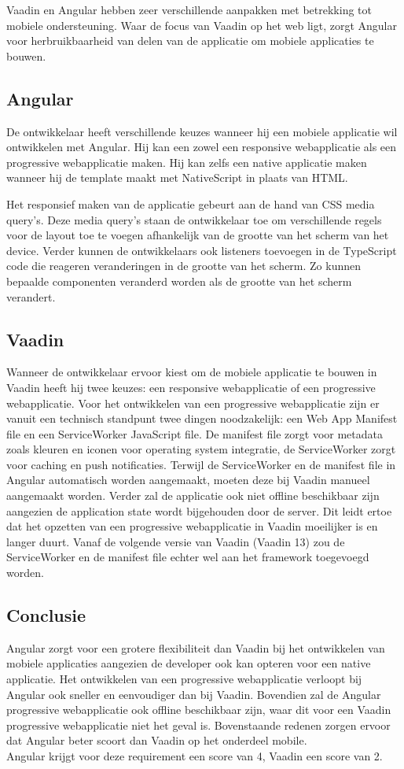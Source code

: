 Vaadin en Angular hebben zeer verschillende aanpakken met betrekking tot mobiele ondersteuning. Waar de focus van Vaadin op het web ligt, zorgt Angular voor herbruikbaarheid van delen van de applicatie om mobiele applicaties te bouwen.
\subsection{Angular}
De ontwikkelaar heeft verschillende keuzes wanneer hij een mobiele applicatie wil ontwikkelen met Angular. Hij kan een zowel een responsive webapplicatie als een progressive webapplicatie maken. Hij kan zelfs een native applicatie maken wanneer hij de template maakt met NativeScript in plaats van HTML. 

Het responsief maken van de applicatie gebeurt aan de hand van CSS media query's. Deze media query's staan de ontwikkelaar toe om verschillende regels voor de layout toe te voegen afhankelijk van de grootte van het scherm van het device. Verder kunnen de ontwikkelaars ook listeners toevoegen in de TypeScript code die reageren veranderingen in de grootte van het scherm. Zo kunnen bepaalde componenten veranderd worden als de grootte van het scherm verandert. 

\subsection{Vaadin}
Wanneer de ontwikkelaar ervoor kiest om de mobiele applicatie te bouwen in Vaadin heeft hij twee keuzes: een responsive webapplicatie of een progressive webapplicatie. 
Voor het ontwikkelen van een progressive webapplicatie zijn er vanuit een technisch standpunt twee dingen noodzakelijk: een  Web App Manifest file en een ServiceWorker JavaScript file. De manifest file zorgt voor metadata zoals kleuren en iconen voor operating system integratie, de ServiceWorker zorgt voor caching en push notificaties.
Terwijl de ServiceWorker en de manifest file in Angular automatisch worden aangemaakt, moeten deze bij Vaadin manueel aangemaakt worden. Verder zal de applicatie ook niet offline beschikbaar zijn aangezien de application state wordt bijgehouden door de server.
Dit leidt ertoe dat het opzetten van een progressive webapplicatie in Vaadin moeilijker is en langer duurt.  
Vanaf de volgende versie van Vaadin (Vaadin 13) zou de ServiceWorker en de manifest file echter wel aan het framework toegevoegd worden. 
\subsection{Conclusie}
Angular zorgt voor een grotere flexibiliteit dan Vaadin bij het ontwikkelen van mobiele applicaties aangezien de developer ook kan opteren voor een native applicatie. Het ontwikkelen van een progressive webapplicatie verloopt bij Angular ook sneller en eenvoudiger dan bij Vaadin. Bovendien zal de Angular progressive webapplicatie ook offline beschikbaar zijn, waar dit voor een Vaadin progressive webapplicatie niet het geval is. Bovenstaande redenen zorgen ervoor dat Angular beter scoort dan Vaadin op het onderdeel mobile. \\
Angular krijgt voor deze requirement een score van 4, Vaadin een score van 2.

